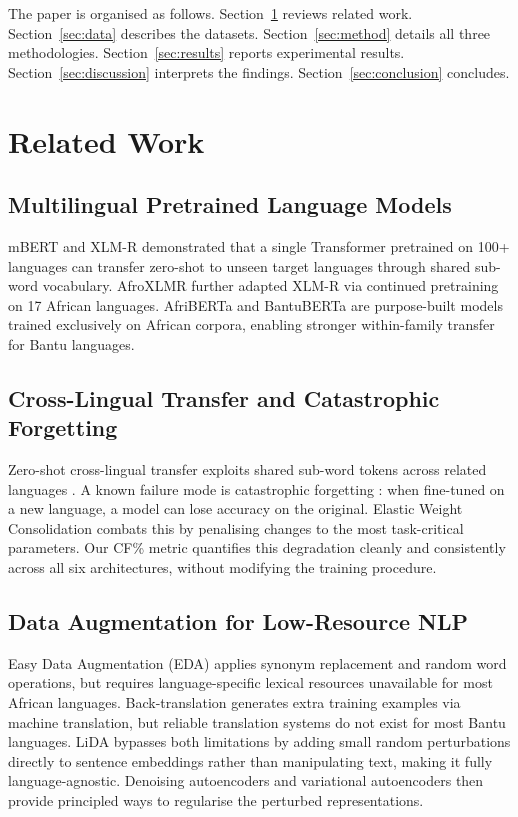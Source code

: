 \documentclass[conference]{IEEEtran}
\begin{document}
The paper is organised as follows. Section~\ref{sec:related} reviews
related work. Section~\ref{sec:data} describes the datasets.
Section~\ref{sec:method} details all three methodologies.
Section~\ref{sec:results} reports experimental results.
Section~\ref{sec:discussion} interprets the findings.
Section~\ref{sec:conclusion} concludes.

\section{Related Work}\label{sec:related}

\subsection{Multilingual Pretrained Language Models}
mBERT \cite{b_devlin} and XLM-R \cite{b_conneau} demonstrated that a
single Transformer pretrained on 100+ languages can transfer zero-shot
to unseen target languages through shared sub-word vocabulary.
AfroXLMR \cite{b_alabi} further adapted XLM-R via continued pretraining
on 17 African languages. AfriBERTa \cite{b_ogueji} and BantuBERTa
\cite{b_dossou} are purpose-built models trained exclusively on African
corpora, enabling stronger within-family transfer for Bantu languages.

\subsection{Cross-Lingual Transfer and Catastrophic Forgetting}
Zero-shot cross-lingual transfer exploits shared sub-word tokens across
related languages \cite{b_conneau}. A known failure mode is catastrophic
forgetting \cite{b_mccloskey}: when fine-tuned on a new language, a model
can lose accuracy on the original. Elastic Weight Consolidation
\cite{b_kirkpatrick} combats this by penalising changes to the most
task-critical parameters. Our CF\% metric quantifies this degradation
cleanly and consistently across all six architectures, without modifying
the training procedure.

\subsection{Data Augmentation for Low-Resource NLP}
Easy Data Augmentation (EDA) \cite{b_wei} applies synonym replacement and
random word operations, but requires language-specific lexical resources
unavailable for most African languages. Back-translation
\cite{b_sennrich} generates extra training examples via machine
translation, but reliable translation systems do not exist for most
Bantu languages. LiDA \cite{b_mage} bypasses both limitations by adding
small random perturbations directly to sentence embeddings rather than
manipulating text, making it fully language-agnostic. Denoising
autoencoders \cite{b_vincent} and variational autoencoders \cite{b_kingma}
then provide principled ways to regularise the perturbed representations.
\end{document}
